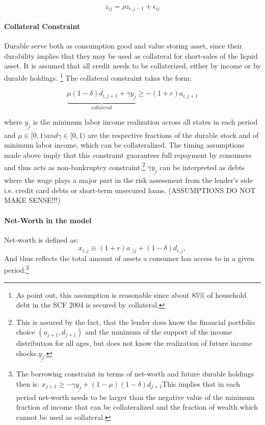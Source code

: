 \documentclass[a4paper,12pt]{article}
\begin{document}
\[z_{ij} = \rho z_{i,j-1}+\epsilon_{ij}\]

\paragraph{Collateral Constraint}
Durable serve both as consumption good and value storing asset, since their durability implies that they may be used as collateral for short-sales of the liquid asset. It is assumed that all credit needs to be collaterized, either by income or by durable holdings. \footnote{As \citep{hintermaier2010} point out, this assumption is reasonable since about 85\% of household debt in the SCF 2004 is secured by collateral.} The collateral constraint takes the form:

\begin{equation}
\underbrace{\mu(1-\delta)d_{i,j+1} + \gamma\underline{y_{j}}}_{collateral} \geq -(1+r)a_{i,j+1}
\end{equation}

where $\underline{y_{j}}$ is the minimum labor income realization across all states in each period and $\mu \in [0,1) and \gamma \in [0,1)$ are the respective fractions of the durable stock and of minimum labor income, which can be collateralized. The timing assumptions made above imply that this constraint guarantees full repayment by consumers and thus acts as non-bankruptcy constraint.\footnote{This is assured by the fact, that the lender does know the financial portfolio choice $(a_{j+1},d_{j+1})$ and the minimum of the support of the income distribution for all ages, but does not know the realization of future income shocks.$\underline{y_{j}}$.} $\gamma\underline{y_{j}}$ can be interpreted as debts where the wage plays a major part in the risk assessment from the lender's side i.e. credit card debts or short-term unsecured loans. 
(ASSUMPTIONS DO NOT MAKE SENSE!!!) 

\paragraph{Net-Worth in the model} 
Net-worth is defined as:
\begin{equation}
x_{i,j} \equiv (1+r)a_{,ij} + (1-\delta)d_{i,j},
\end{equation}
And thus reflects the total amount of assets a consumer has access to in a given period.\footnote{The borrowing constraint in terms of net-worth and future durable holdings then is: $x_{j+1} \geq -\gamma\underline{y_{j}}+(1-\mu)(1-\delta)d_{j+1}$This implies that in each period net-worth needs to be larger than the negative value of the minimum fraction of income that can be collateralized and the fraction of wealth which cannot be used as collateral.}
\end{document}
